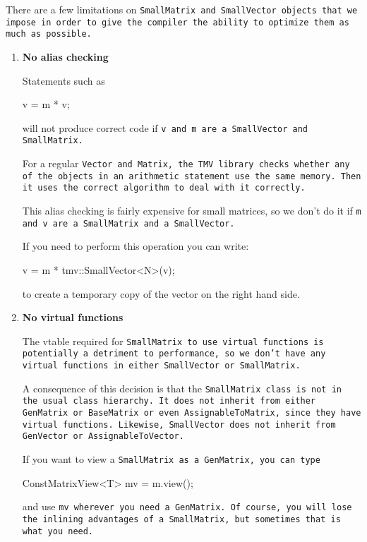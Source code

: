 There are a few limitations on \tt{SmallMatrix} and \tt{SmallVector} objects
that we impose in order to give the compiler the ability to
optimize them as much as possible.

\begin{enumerate}

\item
\textbf{No alias checking}

Statements such as 
\begin{tmvcode}
v = m * v;
\end{tmvcode}
will not produce correct code if \tt{v} and \tt{m} are a \tt{SmallVector} and \tt{SmallMatrix}.  

For a regular \tt{Vector} and \tt{Matrix}, the TMV library checks whether any of 
the objects in an arithmetic statement use the same memory.  
Then it uses the correct algorithm to deal with it 
correctly.  

This alias checking is fairly expensive for small matrices, so we don't do it if
\tt{m} and \tt{v} are a \tt{SmallMatrix} and a \tt{SmallVector}.  

If you need to perform this operation you can write:
\begin{tmvcode}
v = m * tmv::SmallVector<N>(v);
\end{tmvcode}
to create a temporary copy of the vector on the right hand side. 

\item
\textbf{No virtual functions}

The vtable required for \tt{SmallMatrix} to use virtual functions is potentially a 
detriment to performance, so we don't have any virtual functions in either \tt{SmallVector}
or \tt{SmallMatrix}. 

A consequence of this decision is that the \tt{SmallMatrix} class is not in the usual
class hierarchy.  It
does not inherit from either \tt{GenMatrix} or \tt{BaseMatrix} or even \tt{AssignableToMatrix}, 
since they have virtual functions.  
Likewise, \tt{SmallVector} does not inherit from \tt{GenVector} or \tt{AssignableToVector}.

If you want to view a \tt{SmallMatrix} as a \tt{GenMatrix}, you can type
\begin{tmvcode}
ConstMatrixView<T> mv = m.view();
\end{tmvcode}
and use \tt{mv} wherever you need a \tt{GenMatrix}.  Of course, you will lose the 
inlining advantages of a \tt{SmallMatrix}, but sometimes that is what you need.


\end{enumerate}
